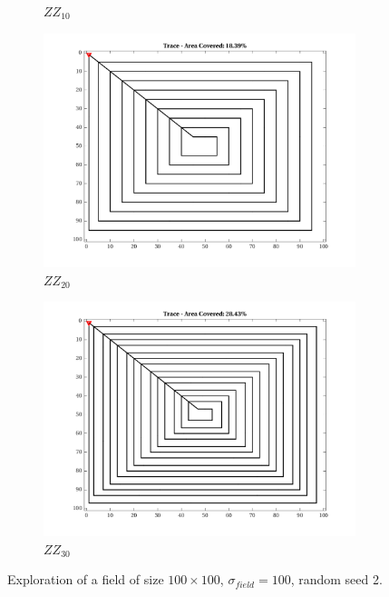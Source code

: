 \begin{figure}[htb!]
\begin{subfigure}[t]{0.3333\textwidth}
        \captionsetup{skip=0.20\baselineskip,size=footnotesize}
        \caption{$ZZ_{10}$}
    \end{subfigure}%
    \begin{subfigure}[t]{0.3333\textwidth}
        \centering
        \includegraphics[width=\linewidth]{figures/hbresults/path_zz_20p_100x100_sf_100_seed_2.png}
        \captionsetup{skip=0.20\baselineskip,size=footnotesize}
        \caption{$ZZ_{20}$}
    \end{subfigure}%
    \begin{subfigure}[t]{0.3333\textwidth}
        \centering
        \includegraphics[width=\linewidth]{figures/hbresults/path_zz_30p_100x100_sf_100_seed_2.png}
        \captionsetup{skip=0.20\baselineskip,size=footnotesize}
        \caption{$ZZ_{30}$}
    \end{subfigure}%
    \captionsetup{skip=0.20\baselineskip}
    \caption{Exploration of a field of size $100 \times 100$, $\sigma_{field} = 100$, random seed 2.}
    \label{fig:sf100}
\end{figure}

